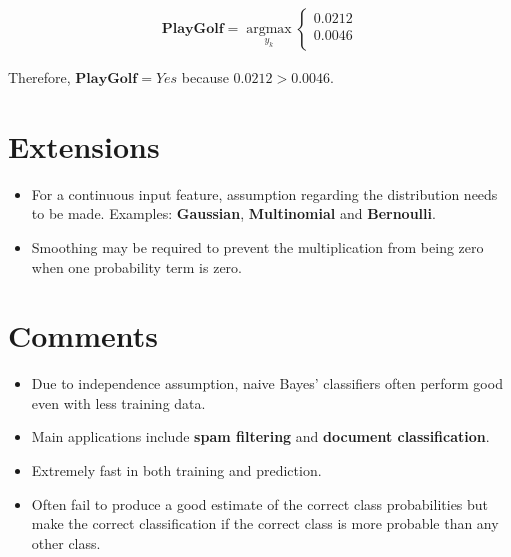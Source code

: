 \documentclass[11pt, a4paper]{article}
\begin{document}
\begin{align*}
	\mathbf{PlayGolf} = \operatorname*{argmax}_{y_k}\left\{ 
	\begin{array}{ll}                                       
	0.0212                                                  
	                                                        \\
	0.0046                                                  \\
	\end{array}                                             
	\right.                                                 
\end{align*}

Therefore, $\textbf{PlayGolf}=Yes$ because $0.0212 > 0.0046$.

\section{Extensions} 

\begin{itemize}
	\item For a continuous input feature, assumption regarding the distribution needs to be made. Examples: \textbf{Gaussian}, \textbf{Multinomial} and \textbf{Bernoulli}. 
	\item Smoothing may be required to prevent the multiplication from being zero when one probability term is zero.
\end{itemize}

\section{Comments}
\begin{itemize}
	\item Due to independence assumption, naive Bayes' classifiers often perform good even with less training data.
	\item Main applications include \textbf{spam filtering} and \textbf{document classification}.
	\item Extremely fast in both training and prediction.
	\item Often fail to produce a good estimate of the correct class probabilities but make the correct classification if the correct class is more probable than any other class.
\end{itemize}
\end{document}
